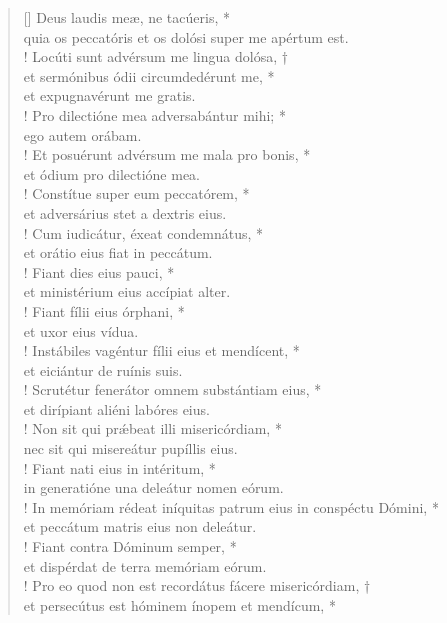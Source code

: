 \begin{verse}[\versewidth]
Deus laudis meæ, ne tacúeris, *\\
quia os peccatóris et os dolósi super me apértum est.\\!
\vin Locúti sunt advérsum me lingua dolósa, †\\
\vin et sermónibus ódii circumdedérunt me, *\\
\vin et expugnavérunt me gratis.\\!
Pro dilectióne mea adversabántur mihi; *\\
ego autem orábam.\\!
\vin Et posuérunt advérsum me mala pro bonis, *\\
\vin et ódium pro dilectióne mea.\\!
Constítue super eum peccatórem, *\\
et adversárius stet a dextris eius.\\!
\vin Cum iudicátur, éxeat condemnátus, *\\
\vin et orátio eius fiat in peccátum.\\!
Fiant dies eius pauci, *\\
et ministérium eius accípiat alter.\\!
\vin Fiant fílii eius órphani, *\\
\vin et uxor eius vídua.\\!
Instábiles vagéntur fílii eius et mendícent, *\\
et eiciántur de ruínis suis.\\!
\vin Scrutétur fenerátor omnem substántiam eius, *\\
\vin et dirípiant aliéni labóres eius.\\!
Non sit qui pr\'{æ}beat illi misericórdiam, *\\
nec sit qui misereátur pupíllis eius.\\!
\vin Fiant nati eius in intéritum, *\\
\vin in generatióne una deleátur nomen eórum.\\!
In memóriam rédeat iníquitas patrum eius in conspéctu Dómini, *\\
et peccátum matris eius non deleátur.\\!
\vin Fiant contra Dóminum semper, *\\
\vin et dispérdat de terra memóriam eórum.\\!
Pro eo quod non est recordátus fácere misericórdiam, †\\
et persecútus est hóminem ínopem et mendícum, *\\

\end{verse}
